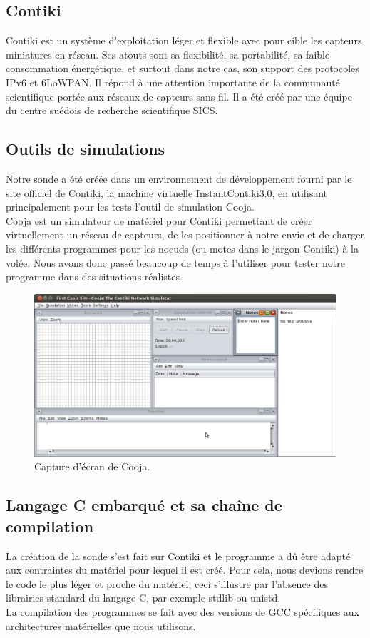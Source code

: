 	\subsection{Contiki}
	Contiki est un système d'exploitation léger et flexible avec pour cible les capteurs miniatures en réseau. Ses atouts sont sa flexibilité, sa portabilité, sa faible consommation énergétique, et surtout dans notre cas, son support des protocoles IPv6 et 6LoWPAN. Il répond à une attention importante de la communauté scientifique portée aux réseaux de capteurs sans fil. Il a été créé par une équipe du centre suédois de recherche scientifique SICS.
	
	\subsection{Outils de simulations}
	Notre sonde a été créée dans un environnement de développement fourni par le site officiel de Contiki, la machine virtuelle InstantContiki3.0, en utilisant principalement pour les tests l'outil de simulation Cooja.\\
	Cooja est un simulateur de matériel pour Contiki permettant de créer virtuellement un réseau de capteurs, de les positionner à notre envie et de charger les différents programmes pour les noeuds (ou motes dans le jargon Contiki) à la volée.
	Nous avons donc passé beaucoup de temps à l'utiliser pour tester notre programme dans des situations réalistes.
	\clearpage
	\begin{figure}[htp]
		\centering
		\includegraphics[width=16cm]{images/cooja}
		\caption{Capture d'écran de Cooja.}
		\label{fig:Cooja}
	\end{figure}

	\subsection{Langage C embarqué et sa chaîne de compilation}
	La création de la sonde s'est fait sur Contiki et le programme a dû être adapté aux contraintes du matériel pour lequel il est créé. Pour cela, nous devions rendre le code le plus léger et proche du matériel, ceci s'illustre par l'absence des librairies standard du langage C, par exemple stdlib ou unistd.\\
	La compilation des programmes se fait avec des versions de GCC spécifiques aux architectures matérielles que nous utilisons.
	
